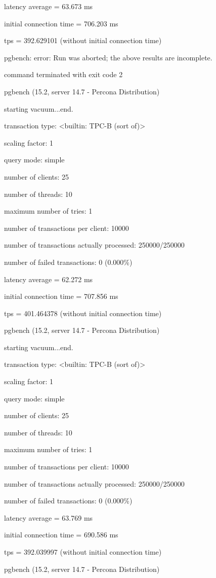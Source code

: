 latency average = 63.673 ms

initial connection time = 706.203 ms

tps = 392.629101 (without initial connection time)

pgbench: error: Run was aborted; the above results are incomplete.

command terminated with exit code 2


pgbench (15.2, server 14.7 - Percona Distribution)

starting vacuum...end.

transaction type: <builtin: TPC-B (sort of)>

scaling factor: 1

query mode: simple

number of clients: 25

number of threads: 10

maximum number of tries: 1

number of transactions per client: 10000

number of transactions actually processed: 250000/250000

number of failed transactions: 0 (0.000\%)

latency average = 62.272 ms

initial connection time = 707.856 ms

tps = 401.464378 (without initial connection time)

pgbench (15.2, server 14.7 - Percona Distribution)

starting vacuum...end.

transaction type: <builtin: TPC-B (sort of)>

scaling factor: 1

query mode: simple

number of clients: 25

number of threads: 10

maximum number of tries: 1

number of transactions per client: 10000

number of transactions actually processed: 250000/250000

number of failed transactions: 0 (0.000\%)

latency average = 63.769 ms

initial connection time = 690.586 ms

tps = 392.039997 (without initial connection time)

pgbench (15.2, server 14.7 - Percona Distribution)

